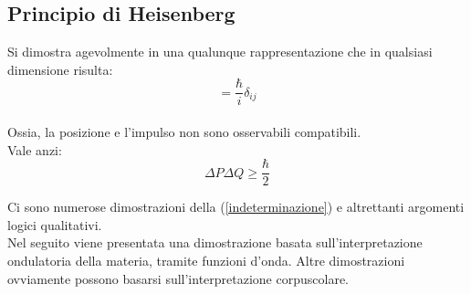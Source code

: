 \documentclass[twoside]{article}
\begin{document}
\vspace{0.5cm}

\subsection{Principio di Heisenberg}
Si dimostra agevolmente in una qualunque rappresentazione che in qualsiasi dimensione risulta:
\begin{equation}
    [\hat{P_i},\hat{Q_j}]=\frac{\hbar}{i} \delta_{ij}
\end{equation}
\\
Ossia, la posizione e l'impulso non sono osservabili compatibili.\\
Vale anzi:
\begin{equation}\label{indeterminazione}
    \Delta P \Delta Q \geq \frac{\hbar}{2}
\end{equation}

Ci sono numerose dimostrazioni della (\ref{indeterminazione}) e altrettanti argomenti logici qualitativi.
\\
Nel seguito viene presentata una dimostrazione basata sull'interpretazione ondulatoria della materia, tramite funzioni d'onda. Altre dimostrazioni ovviamente possono basarsi sull'interpretazione corpuscolare.
\end{document}
